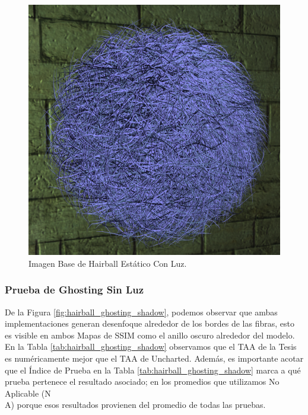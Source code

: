 \documentclass[pregrado]{tesis-usb} %
\begin{document}
\begin{figure}[!htb]
	\centering
	\includegraphics[scale=0.2]{images/results/hairball_light_sobel_ground_truth.png}
	\caption{Imagen Base de Hairball Estático Con Luz.}\label{fig:hairball_static_lighted_truth}
\end{figure}

\FloatBarrier

\subsubsection{Prueba de Ghosting Sin Luz}
De la Figura \ref{fig:hairball_ghosting_shadow}, podemos observar que ambas implementaciones generan desenfoque alrededor de los bordes de las fibras, esto es visible en ambos Mapas de SSIM como el anillo oscuro alrededor del modelo. En la Tabla \ref{tab:hairball_ghosting_shadow} observamos que el TAA de la Tesis es numéricamente mejor que el TAA de Uncharted. Además, es importante acotar que el Índice de Prueba en la Tabla \ref{tab:hairball_ghosting_shadow} marca a qué prueba pertenece el resultado asociado; en los promedios que utilizamos No Aplicable (N \\ A) porque esos resultados provienen del promedio de todas las pruebas.
\end{document}
